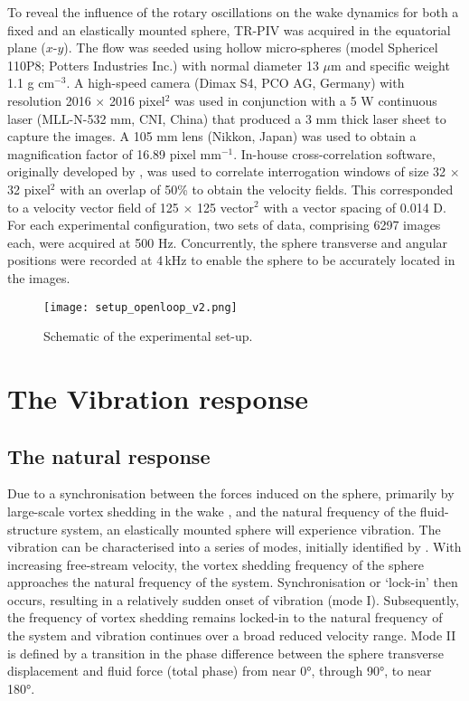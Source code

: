 \documentclass[3p]{elsarticle}
\begin{document}
To reveal the influence of the rotary oscillations on the wake
dynamics for both a fixed and an elastically mounted sphere, TR-PIV was
acquired in the equatorial plane ($x$-$y$). The flow was seeded using
hollow micro-spheres (model Sphericel 110P8; Potters Industries Inc.)
with normal diameter 13 $\mu$m and specific weight 1.1 g cm$^{-3}$. A
high-speed camera (Dimax S4, PCO AG, Germany) with resolution 2016
$\times$ 2016 pixel$^2$ was used in conjunction with a 5 W continuous
laser (MLL-N-532 mm, CNI, China) that produced a 3 mm thick laser
sheet to capture the images. A 105 mm lens (Nikkon, Japan) was used to
obtain a magnification factor of 16.89 pixel mm$^{-1}$. In-house
cross-correlation software, originally developed by
\citet{fouras2008}, was used to correlate interrogation windows of
size 32 $\times$ 32 pixel$^2$ with an overlap of 50\% to obtain the
velocity fields. This corresponded to a velocity vector field of 125
$\times$ 125 vector$^2$ with a vector spacing of 0.014 D. For each
experimental configuration, two sets of data, comprising 6297 images
each, were acquired at 500 Hz. Concurrently, the sphere transverse and
angular positions were recorded at 4\,kHz to enable the sphere to be
accurately located in the images.

%
\begin{figure}                                         
	\centering                                     
	\texttt{[image: setup\_openloop\_v2.png]}        
	\caption{Schematic of the experimental set-up.}
	\label{fig:setup}                              
\end{figure}                                           
%

\section{The Vibration response}%
\label{sec:response}%
\subsection{The natural response}%
Due to a synchronisation between the forces induced on the sphere,
primarily by large-scale vortex shedding in the wake
\citep{Govardhan2005}, and the natural frequency of the
fluid-structure system, an elastically mounted sphere will experience
vibration. The vibration can be characterised into a series of modes,
initially identified by \citet{Jauvtis2001}. With increasing
free-stream velocity, the vortex shedding frequency of the sphere
approaches the natural frequency of the system. Synchronisation or
`lock-in' then occurs, resulting in a relatively sudden onset of
vibration (mode I). Subsequently, the frequency of vortex shedding
remains locked-in to the natural frequency of the system and vibration
continues over a broad reduced velocity range. Mode II is defined by a
transition in the phase difference between the sphere transverse displacement and fluid force (total phase) from near \ang{0}, through \ang{90}, to near
\ang{180}. 
\end{document}
